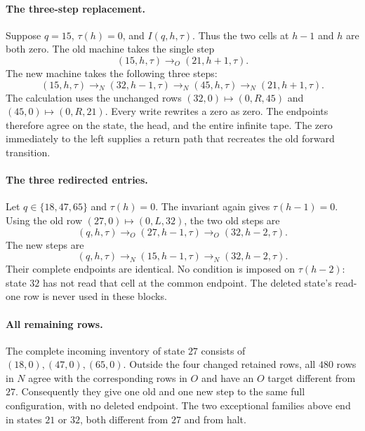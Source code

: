 \paragraph{The three-step replacement.}
Suppose $q=15$, $\tau(h)=0$, and $I(q,h,\tau)$. Thus the two cells at $h-1$
and $h$ are both zero. The old machine takes the single step
\[
 (15,h,\tau)\longrightarrow_O(21,h+1,\tau).
\]
The new machine takes the following three steps:
\[
 (15,h,\tau)\longrightarrow_N(32,h-1,\tau)
 \longrightarrow_N(45,h,\tau)
 \longrightarrow_N(21,h+1,\tau).
\]
The calculation uses the unchanged rows
$(32,0)\mapsto(0,R,45)$ and
$(45,0)\mapsto(0,R,21)$. Every write rewrites a zero as zero.
The endpoints therefore agree on the state, the head, and the entire
infinite tape. The zero immediately to the left supplies a return path
that recreates the old forward transition.

\paragraph{The three redirected entries.}
Let $q\in\{18,47,65\}$ and $\tau(h)=0$. The invariant again gives
$\tau(h-1)=0$. Using the old row
$(27,0)\mapsto(0,L,32)$, the two old steps are
\[
 (q,h,\tau)\longrightarrow_O(27,h-1,\tau)
 \longrightarrow_O(32,h-2,\tau).
\]
The new steps are
\[
 (q,h,\tau)\longrightarrow_N(15,h-1,\tau)
 \longrightarrow_N(32,h-2,\tau).
\]
Their complete endpoints are identical. No condition is imposed on
$\tau(h-2)$: state $32$ has not read that cell at the common endpoint.
The deleted state's read-one row is never used in these blocks.

\paragraph{All remaining rows.}
The complete incoming inventory of state $27$ consists of
$(18,0),(47,0),(65,0)$. Outside the four changed retained rows,
all $480$ rows in $N$ agree with the corresponding rows in $O$ and have
an $O$ target different from $27$. Consequently they give one old and
one new step to the same full configuration, with no deleted endpoint.
The two exceptional families above end in states $21$ or $32$, both
different from $27$ and from halt.

